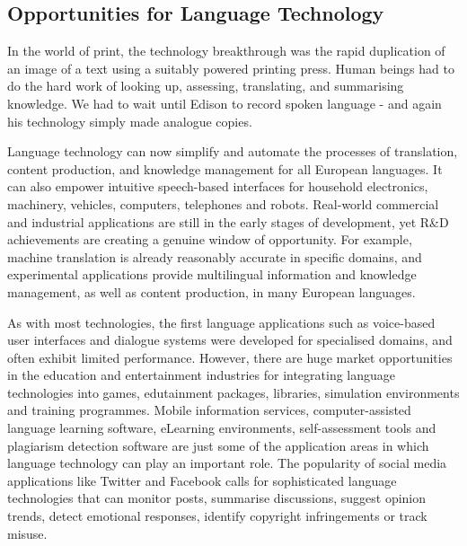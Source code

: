 \documentclass[]{../metanetpaper}
\begin{document}
\begin{multicols}{2}
\subsection{Opportunities for Language Technology}

In the world of print, the technology breakthrough was the rapid duplication of an image of a text using a suitably powered printing press. Human beings had to do the hard work of looking up, assessing, translating, and summarising knowledge. We had to wait until Edison to record spoken language - and again his technology simply made analogue copies.

Language technology can now simplify and automate the processes of translation, content production, and knowledge management for all European languages. It can also empower intuitive speech-based interfaces for household electronics, machinery, vehicles, computers, telephones and robots. Real-world commercial and industrial applications are still in the early stages of development, yet R\&D achievements are creating a genuine window of opportunity. For example, machine translation is already reasonably accurate in specific domains, and experimental applications provide multilingual information and knowledge management, as well as content production, in many European languages. 

As with most technologies, the first language applications such as voice-based user interfaces and dialogue systems were developed for specialised domains, and often exhibit limited performance. However, there are huge market opportunities in the education and entertainment industries for integrating language technologies into games, edutainment packages, libraries, simulation environments and training programmes. Mobile information services, computer-assisted language learning software, eLearning environments, self-assessment tools and plagiarism detection software are just some of the application areas in which language technology can play an important role. The popularity of social media applications like Twitter and Facebook calls for sophisticated language technologies that can monitor posts, summarise discussions, suggest opinion trends, detect emotional responses, identify copyright infringements or track misuse.



\end{multicols}
\end{document}
